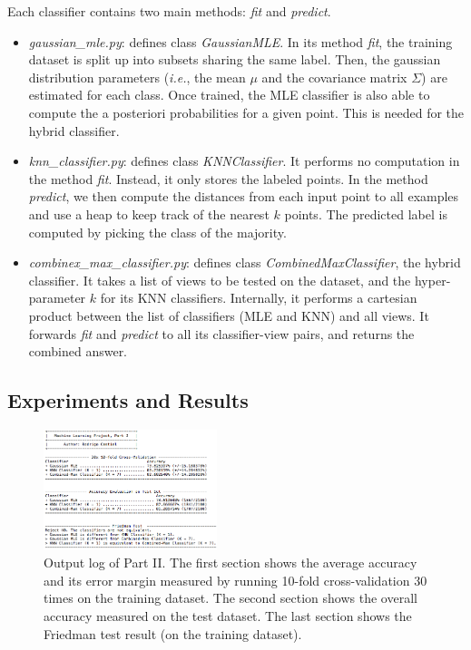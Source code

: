 \documentclass[conference]{IEEEtran}
\begin{document}
Each classifier contains two main methods: \textit{fit} and \textit{predict}.
\begin{itemize}
\item \textit{gaussian\_mle.py}: defines class \textit{GaussianMLE}.
In its method \textit{fit}, the training dataset is split up into subsets sharing the same label.
Then, the gaussian distribution parameters (\textit{i.e.}, the mean $\mu$ and the covariance matrix $\Sigma$) are estimated for each class.
Once trained, the MLE classifier is also able to compute the a posteriori probabilities for a given point.
This is needed for the hybrid classifier.
\item \textit{knn\_classifier.py}: defines class \textit{KNNClassifier}.
It performs no computation in the method \textit{fit}.
Instead, it only stores the labeled points.
In the method \textit{predict}, we then compute the distances from each input point to all examples and use a heap to keep track of the nearest $k$ points.
The predicted label is computed by picking the class of the majority.
\item \textit{combinex\_max\_classifier.py}: defines class \textit{CombinedMaxClassifier}, the hybrid classifier.
It takes a list of views to be tested on the dataset, and the hyper-parameter $k$ for its KNN classifiers.
Internally, it performs a cartesian product between the list of classifiers (MLE and KNN) and all views.
It forwards \textit{fit} and \textit{predict} to all its classifier-view pairs, and returns the combined answer.

\end{itemize}

\subsection{Experiments and Results}

\begin{figure}
\label{part_ii_results}
\includegraphics[width=0.45\textwidth]{part_ii_results.png}
\caption{Output log of Part II. The first section shows the average accuracy and its error margin measured by running 10-fold cross-validation 30 times on the training dataset. The second section shows the overall accuracy measured on the test dataset. The last section shows the Friedman test result (on the training dataset).}
\end{figure}
\end{document}
